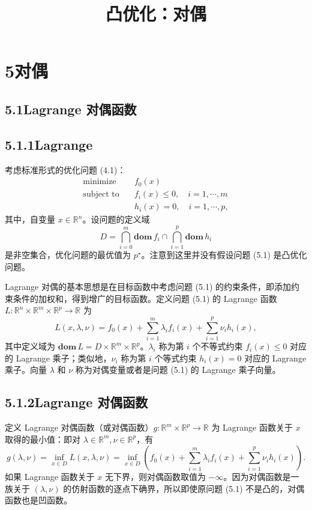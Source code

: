 \documentclass[UTF8,12pt,a4paper,fontset=fandol]{ctexart}
\title{凸优化：对偶}
\author{}
\date{}
\begin{document}
\maketitle

\section*{5\quad 对偶}

\subsection*{5.1\quad Lagrange 对偶函数}

\subsection*{5.1.1\quad Lagrange}

考虑标准形式的优化问题 (4.1)：
\begin{equation}
\begin{aligned}
\text{minimize}\quad & f_0(x)\\
\text{subject to}\quad & f_i(x)\leq 0,\quad i=1,\cdots,m\\
& h_i(x)=0,\quad i=1,\cdots,p,
\end{aligned}
\tag{5.1}
\end{equation}
其中，自变量 $x\in\mathbb{R}^n$。设问题的定义域
\[
D=\bigcap_{i=0}^m \mathbf{dom}\,f_i\cap \bigcap_{i=1}^p \mathbf{dom}\,h_i
\]
是非空集合，优化问题的最优值为 $p^\star$。注意到这里并没有假设问题 (5.1) 是凸优化问题。

Lagrange 对偶的基本思想是在目标函数中考虑问题 (5.1) 的约束条件，即添加约束条件的加权和，得到增广的目标函数。定义问题 (5.1) 的 Lagrange 函数 $L:\mathbb{R}^n\times\mathbb{R}^m\times\mathbb{R}^p\to\mathbb{R}$ 为
\[
L(x,\lambda,\nu)=f_0(x)+\sum_{i=1}^m \lambda_i f_i(x)+\sum_{i=1}^p \nu_i h_i(x),
\]
其中定义域为 $\mathbf{dom}\,L=D\times\mathbb{R}^m\times\mathbb{R}^p$。$\lambda_i$ 称为第 $i$ 个不等式约束 $f_i(x)\leq 0$ 对应的 Lagrange 乘子；类似地，$\nu_i$ 称为第 $i$ 个等式约束 $h_i(x)=0$ 对应的 Lagrange 乘子。向量 $\lambda$ 和 $\nu$ 称为对偶变量或者是问题 (5.1) 的 Lagrange 乘子向量。

\subsection*{5.1.2\quad Lagrange 对偶函数}

定义 Lagrange 对偶函数（或对偶函数）$g:\mathbb{R}^m\times\mathbb{R}^p\to\mathbb{R}$ 为 Lagrange 函数关于 $x$ 取得的最小值：即对 $\lambda\in\mathbb{R}^m,\nu\in\mathbb{R}^p$，有
\[
g(\lambda,\nu)=\inf_{x\in D} L(x,\lambda,\nu)
=\inf_{x\in D}\left(f_0(x)+\sum_{i=1}^m \lambda_i f_i(x)+\sum_{i=1}^p \nu_i h_i(x)\right).
\]
如果 Lagrange 函数关于 $x$ 无下界，则对偶函数取值为 $-\infty$。因为对偶函数是一族关于 $(\lambda,\nu)$ 的仿射函数的逐点下确界，所以即使原问题 (5.1) 不是凸的，对偶函数也是凹函数。
\end{document}
